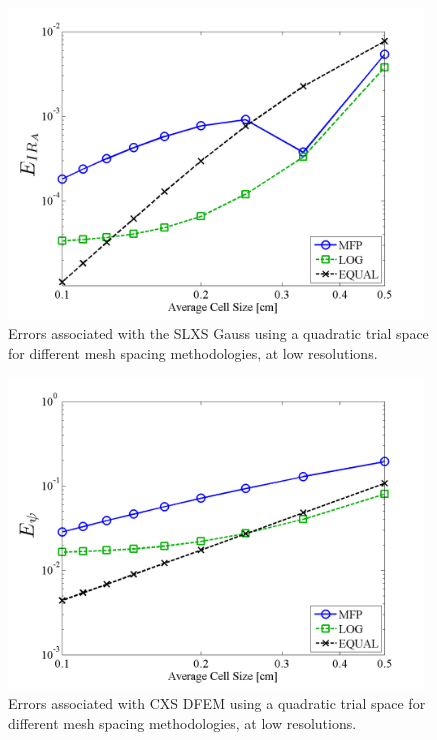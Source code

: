 \begin{figure}[!htp]
\centering
\includegraphics[width=11cm]{chapter3_variable_xs/LOW_RES_P2_GAUSS_E_IR_A.png}
\caption{Errors associated with the SLXS Gauss using a quadratic trial space for different mesh spacing methodologies, at low resolutions.}
\label{fig:low_res_gauss_ir_A}
\end{figure}
%
%
\begin{figure}[!hbp]
\centering
\includegraphics[width=11cm]{chapter3_variable_xs/LOW_RES_P2_CXS_E_PSI.png}
\caption{Errors associated with CXS DFEM using a quadratic trial space  for different mesh spacing methodologies, at low resolutions.}
\label{fig:low_res_cxs_psi}
\end{figure}
%
